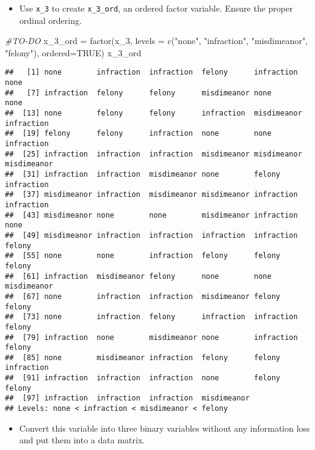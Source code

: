 \documentclass[
]{article}
\newenvironment{Shaded}{\begin{snugshade}}{\end{snugshade}}
\newcommand{\AttributeTok}[1]{\textcolor[rgb]{0.77,0.63,0.00}{#1}}
\newcommand{\CommentTok}[1]{\textcolor[rgb]{0.56,0.35,0.01}{\textit{#1}}}
\newcommand{\ConstantTok}[1]{\textcolor[rgb]{0.00,0.00,0.00}{#1}}
\newcommand{\FunctionTok}[1]{\textcolor[rgb]{0.00,0.00,0.00}{#1}}
\newcommand{\NormalTok}[1]{#1}
\newcommand{\OtherTok}[1]{\textcolor[rgb]{0.56,0.35,0.01}{#1}}
\newcommand{\StringTok}[1]{\textcolor[rgb]{0.31,0.60,0.02}{#1}}
\providecommand{\tightlist}{%
  \setlength{\itemsep}{0pt}\setlength{\parskip}{0pt}}
\begin{document}
\begin{itemize}
\tightlist
\item
  Use \texttt{x\_3} to create \texttt{x\_3\_ord}, an ordered factor
  variable. Ensure the proper ordinal ordering.
\end{itemize}

\begin{Shaded}
\begin{Highlighting}[]
\CommentTok{\#TO{-}DO}
\NormalTok{x\_3\_ord }\OtherTok{=} \FunctionTok{factor}\NormalTok{(x\_3, }\AttributeTok{levels =} \FunctionTok{c}\NormalTok{(}\StringTok{"none"}\NormalTok{, }\StringTok{"infraction"}\NormalTok{, }\StringTok{"misdimeanor"}\NormalTok{, }\StringTok{"felony"}\NormalTok{), }\AttributeTok{ordered=}\ConstantTok{TRUE}\NormalTok{)}
\NormalTok{x\_3\_ord}
\end{Highlighting}
\end{Shaded}

\begin{verbatim}
##   [1] none        infraction  infraction  felony      infraction  none       
##   [7] infraction  felony      felony      misdimeanor none        none       
##  [13] none        felony      felony      infraction  misdimeanor infraction 
##  [19] felony      felony      infraction  none        none        infraction 
##  [25] infraction  infraction  infraction  misdimeanor misdimeanor misdimeanor
##  [31] infraction  infraction  misdimeanor none        felony      infraction 
##  [37] misdimeanor infraction  misdimeanor misdimeanor infraction  infraction 
##  [43] misdimeanor none        none        misdimeanor infraction  none       
##  [49] misdimeanor infraction  infraction  infraction  infraction  felony     
##  [55] none        none        infraction  felony      felony      felony     
##  [61] infraction  misdimeanor felony      none        none        misdimeanor
##  [67] none        infraction  infraction  misdimeanor felony      felony     
##  [73] none        infraction  felony      infraction  infraction  felony     
##  [79] infraction  none        misdimeanor none        infraction  felony     
##  [85] none        misdimeanor infraction  felony      felony      infraction 
##  [91] infraction  infraction  infraction  none        felony      felony     
##  [97] infraction  infraction  infraction  misdimeanor
## Levels: none < infraction < misdimeanor < felony
\end{verbatim}

\begin{itemize}
\tightlist
\item
  Convert this variable into three binary variables without any
  information loss and put them into a data matrix.
\end{itemize}
\end{document}
